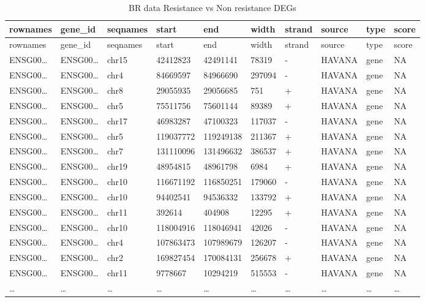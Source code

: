 \documentclass[
]{article}
\begin{document}
\begin{longtable}[]{@{}llllllllll@{}}
\caption{\label{tab:BR-data-Resistance-vs-Non-resistance-DEGs}BR data Resistance vs Non resistance DEGs}\tabularnewline
\toprule
rownames & gene\_id & seqnames & start & end & width & strand & source & type & score\tabularnewline
\midrule
\endfirsthead
\toprule
rownames & gene\_id & seqnames & start & end & width & strand & source & type & score\tabularnewline
\midrule
\endhead
ENSG00\ldots{} & ENSG00\ldots{} & chr15 & 42412823 & 42491141 & 78319 & - & HAVANA & gene & NA\tabularnewline
ENSG00\ldots{} & ENSG00\ldots{} & chr4 & 84669597 & 84966690 & 297094 & - & HAVANA & gene & NA\tabularnewline
ENSG00\ldots{} & ENSG00\ldots{} & chr8 & 29055935 & 29056685 & 751 & + & HAVANA & gene & NA\tabularnewline
ENSG00\ldots{} & ENSG00\ldots{} & chr5 & 75511756 & 75601144 & 89389 & + & HAVANA & gene & NA\tabularnewline
ENSG00\ldots{} & ENSG00\ldots{} & chr17 & 46983287 & 47100323 & 117037 & - & HAVANA & gene & NA\tabularnewline
ENSG00\ldots{} & ENSG00\ldots{} & chr5 & 119037772 & 119249138 & 211367 & + & HAVANA & gene & NA\tabularnewline
ENSG00\ldots{} & ENSG00\ldots{} & chr7 & 131110096 & 131496632 & 386537 & + & HAVANA & gene & NA\tabularnewline
ENSG00\ldots{} & ENSG00\ldots{} & chr19 & 48954815 & 48961798 & 6984 & + & HAVANA & gene & NA\tabularnewline
ENSG00\ldots{} & ENSG00\ldots{} & chr10 & 116671192 & 116850251 & 179060 & - & HAVANA & gene & NA\tabularnewline
ENSG00\ldots{} & ENSG00\ldots{} & chr10 & 94402541 & 94536332 & 133792 & + & HAVANA & gene & NA\tabularnewline
ENSG00\ldots{} & ENSG00\ldots{} & chr11 & 392614 & 404908 & 12295 & + & HAVANA & gene & NA\tabularnewline
ENSG00\ldots{} & ENSG00\ldots{} & chr10 & 118004916 & 118046941 & 42026 & - & HAVANA & gene & NA\tabularnewline
ENSG00\ldots{} & ENSG00\ldots{} & chr4 & 107863473 & 107989679 & 126207 & - & HAVANA & gene & NA\tabularnewline
ENSG00\ldots{} & ENSG00\ldots{} & chr2 & 169827454 & 170084131 & 256678 & + & HAVANA & gene & NA\tabularnewline
ENSG00\ldots{} & ENSG00\ldots{} & chr11 & 9778667 & 10294219 & 515553 & - & HAVANA & gene & NA\tabularnewline
\ldots{} & \ldots{} & \ldots{} & \ldots{} & \ldots{} & \ldots{} & \ldots{} & \ldots{} & \ldots{} & \ldots{}\tabularnewline
\bottomrule
\end{longtable}

\begin{center}\vspace{1.5cm}\end{center}
\end{document}
